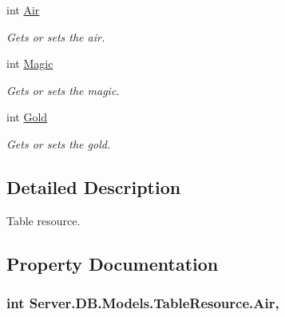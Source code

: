 \begin{DoxyCompactItemize}
int \hyperlink{classServer_1_1DB_1_1Models_1_1TableResource_add08fc3528742e9463f644809803e3c9}{Air}
\begin{DoxyCompactList}\small\item\em Gets or sets the air. \end{DoxyCompactList}\item 
int \hyperlink{classServer_1_1DB_1_1Models_1_1TableResource_a20c66e21806b6d86d0172a8ee3e9fcbc}{Magic}
\begin{DoxyCompactList}\small\item\em Gets or sets the magic. \end{DoxyCompactList}\item 
int \hyperlink{classServer_1_1DB_1_1Models_1_1TableResource_a8dd4232349224d6f9b3d6b7050fa8af4}{Gold}
\begin{DoxyCompactList}\small\item\em Gets or sets the gold. \end{DoxyCompactList}\end{DoxyCompactItemize}


\subsection{Detailed Description}
Table resource. 



\subsection{Property Documentation}
\hypertarget{classServer_1_1DB_1_1Models_1_1TableResource_add08fc3528742e9463f644809803e3c9}{}
\subsubsection[{Air}]{\setlength{\rightskip}{0pt plus 5cm}int Server.\+D\+B.\+Models.\+Table\+Resource.\+Air\hspace{0.3cm}{\ttfamily [get]}, {\ttfamily [set]}}\label{classServer_1_1DB_1_1Models_1_1TableResource_add08fc3528742e9463f644809803e3c9}


